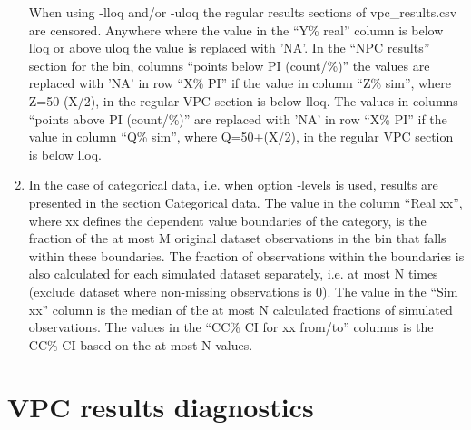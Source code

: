 \begin{enumerate}
When using -lloq and/or -uloq the regular results sections of vpc\_results.csv are censored. Anywhere where the value in the “Y\% real” column is below lloq or above uloq the value is replaced with 'NA'. In the “NPC results” section for the bin, columns “points below PI (count/\%)” the values are replaced with 'NA' in row “X\% PI” if the value in column “Z\% sim”, where Z=50-(X/2), in the regular VPC section is below lloq. The values in columns “points above PI (count/\%)” are replaced with 'NA' in row “X\% PI” if the value in column “Q\% sim”, where Q=50+(X/2), in the regular VPC section is below lloq.

	\item In the case of categorical data, i.e. when option -levels is used, results are presented in the section Categorical data. The value in the column “Real xx”, where xx defines the dependent value boundaries of the category, is the fraction of the at most M original dataset observations in the bin that falls within these boundaries. The fraction of observations within the boundaries is also calculated for each simulated dataset separately, i.e. at most N times (exclude dataset where non-missing observations is 0). The value in the “Sim xx” column is the median of the at most N calculated fractions of simulated observations. The values in the “CC\% CI for xx from/to” columns is the CC\% CI based on the at most N values.
\end{enumerate}

\section{VPC results diagnostics}

